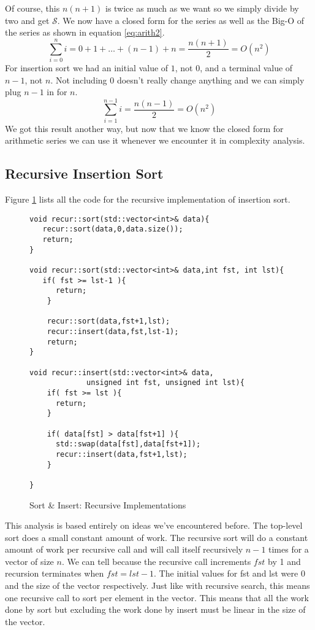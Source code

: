 \documentclass[]{tufte-handout}
\begin{document}
Of course, this $n(n+1)$ is twice as much as we want so we simply divide by two and get $\mathcal{S}$. We now have a closed form for the series as well as the Big-O of the series as shown in equation \ref{eq:arith2}.
\begin{equation}
\sum\limits_{i=0}^{n} i = 0 + 1 + \ldots +(n-1) + n = \dfrac{n(n+1)}{2} = O(n^2)
\label{eq:arith2}
\end{equation}
For insertion sort we had an initial value of $1$, not $0$, and a terminal value of $n-1$, not $n$. Not including $0$ doesn't really change anything and we can simply plug $n-1$ in for $n$.
\[
\sum\limits_{i=1}^{n-1} i = \dfrac{n(n-1)}{2} = O(n^2)
\]
We got this result another way, but now that we know the closed form for arithmetic series we can use it whenever we encounter it in complexity analysis.


\subsection{Recursive Insertion Sort}

Figure \ref{code:isortrec} lists all the code for the recursive implementation of insertion sort. 
\begin{figure}
\begin{lstlisting}
void recur::sort(std::vector<int>& data){
   recur::sort(data,0,data.size());
   return;
}

void recur::sort(std::vector<int>& data,int fst, int lst){
   if( fst >= lst-1 ){
      return;
    }

    recur::sort(data,fst+1,lst);
    recur::insert(data,fst,lst-1);
    return;
}

void recur::insert(std::vector<int>& data,
		     unsigned int fst, unsigned int lst){
    if( fst >= lst ){
      return;
    }

    if( data[fst] > data[fst+1] ){
      std::swap(data[fst],data[fst+1]);
      recur::insert(data,fst+1,lst);
    }
    
}
\end{lstlisting}
\label{code:isortrec}
\caption{Sort \& Insert: Recursive Implementations}
\end{figure}

This analysis is based entirely on ideas we've encountered before. The top-level sort does a small constant amount of work. The recursive sort will do a constant amount of work per recursive call and will call itself recursively $n-1$ times for a vector of size $n$. We can tell because the recursive call increments $fst$ by 1 and recursion terminates when $fst = lst-1$. The initial values for fst and lst were 0 and the size of the vector respectively. Just like with recursive search, this means one recursive call to sort per element in the vector. This means that all the work done by sort but excluding the work done by insert must be linear in the size of the vector. 
\end{document}
